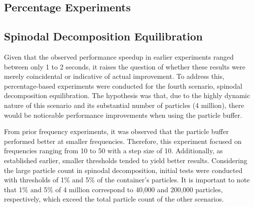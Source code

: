 
\subsection{Percentage Experiments}




\subsection{Spinodal Decomposition Equilibration}

Given that the observed performance speedup in earlier experiments ranged between only 1 to 2 seconds, it raises the question of whether these results were merely coincidental or indicative of actual improvement. To address this, percentage-based experiments were conducted for the fourth scenario, spinodal decomposition equilibration. The hypothesis was that, due to the highly dynamic nature of this scenario and its substantial number of particles (4 million), there would be noticeable performance improvements when using the particle buffer.

From prior frequency experiments, it was observed that the particle buffer performed better at smaller frequencies. Therefore, this experiment focused on frequencies ranging from 10 to 50 with a step size of 10. Additionally, as established earlier, smaller thresholds tended to yield better results. Considering the large particle count in spinodal decomposition, initial tests were conducted with thresholds of 1\% and 5\% of the container’s particles. It is important to note that 1\% and 5\% of 4 million correspond to 40,000 and 200,000 particles, respectively, which exceed the total particle count of the other scenarios.

